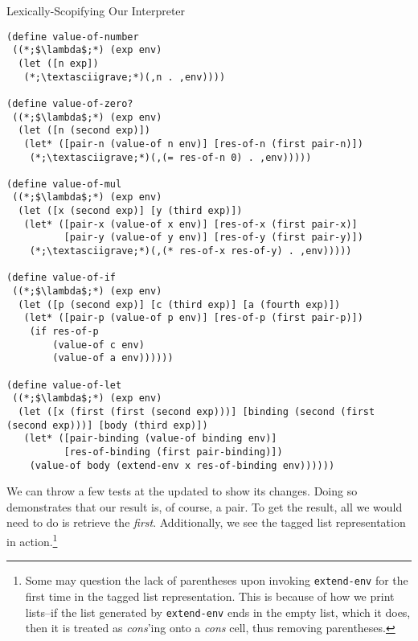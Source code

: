 \begin{cl}[]{Lexically-Scopifying Our Interpreter}
\begin{lstlisting}[language=MyScheme]
(define value-of-number
 ((*;$\lambda$;*) (exp env)
  (let ([n exp])
   (*;\textasciigrave;*)(,n . ,env))))

(define value-of-zero?
 ((*;$\lambda$;*) (exp env)
  (let ([n (second exp)])
   (let* ([pair-n (value-of n env)] [res-of-n (first pair-n)])
    (*;\textasciigrave;*)(,(= res-of-n 0) . ,env)))))

(define value-of-mul
 ((*;$\lambda$;*) (exp env)
  (let ([x (second exp)] [y (third exp)])
   (let* ([pair-x (value-of x env)] [res-of-x (first pair-x)]
          [pair-y (value-of y env)] [res-of-y (first pair-y)]) 
    (*;\textasciigrave;*)(,(* res-of-x res-of-y) . ,env)))))

(define value-of-if
 ((*;$\lambda$;*) (exp env)
  (let ([p (second exp)] [c (third exp)] [a (fourth exp)])
   (let* ([pair-p (value-of p env)] [res-of-p (first pair-p)])
    (if res-of-p
        (value-of c env)
        (value-of a env))))))

(define value-of-let
 ((*;$\lambda$;*) (exp env)
  (let ([x (first (first (second exp)))] [binding (second (first (second exp)))] [body (third exp)])
   (let* ([pair-binding (value-of binding env)] 
          [res-of-binding (first pair-binding)])
    (value-of body (extend-env x res-of-binding env))))))
\end{lstlisting}
\end{cl}

We can throw a few tests at the updated to show its changes. Doing so demonstrates that our result is, of course, a pair. To get the result, all we would need to do is retrieve the \textit{first}. Additionally, we see the tagged list representation in action.\footnote{Some may question the lack of parentheses upon invoking \texttt{extend-env} for the first time in the tagged list representation. This is because of how we print lists--if the list generated by \texttt{extend-env} ends in the empty list, which it does, then it is treated as \textit{cons}'ing onto a \textit{cons} cell, thus removing parentheses.}


